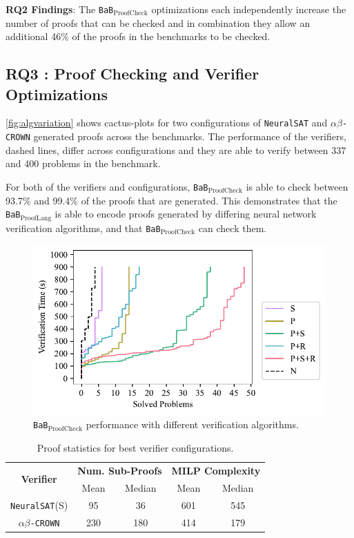\documentclass[oneside,11pt,dvipsnames]{book}
\newcommand{\ignore}[1]{}
\newcommand{\prooflang}{\texttt{BaB$_{\text{ProofLang}}$}}
\newcommand{\proofcheck}{\texttt{BaB$_{\text{ProofCheck}}$}}
\newcommand{\crown}{\texttt{$\alpha\beta$-CROWN}}
\newcommand{\neuralsat}{\texttt{NeuralSAT}}
\begin{document}
\begin{tcolorbox}[left=1pt,right=1pt,top=1pt,bottom=1pt]
\textbf{RQ2 Findings}: The \proofcheck{} optimizations each independently increase the number of proofs that can be checked and in combination they allow
an additional 46\% of the proofs in the benchmarks to be checked.
\end{tcolorbox}

\subsection{RQ3 : Proof Checking and Verifier Optimizations}
\label{sec:rq3}
\autoref{fig:algvariation} shows cactus-plots for two configurations of \neuralsat{} and \crown{} generated proofs across the benchmarks.   The performance of the verifiers, dashed lines, differ across configurations and they are able to 
verify between 337 and 400 problems in the benchmark.
\ignore{Number of Verified/Proved problems
    + abcrown(babsr):   337/335 = 99.4%
    + abcrown:          368/366 = 99.4%
    + neuralsat(SX):    387/363 = 93.7%
    + neuralsat(S)(SX): 400/384 = 96%
}
For both of the verifiers and configurations,
\proofcheck{} is able to check between 93.7\% and 99.4\% of the proofs that are generated.
This demonstrates that the \prooflang{} is able to encode proofs
generated by differing neural network verification algorithms, and
that \proofcheck{} can check them.

\begin{figure}[t]
    \centering
    \includegraphics[width=0.8\linewidth]{figure/ablation.pdf}
    \caption{\proofcheck{} performance with different verification algorithms.}
    \label{fig:algvariation}
\end{figure}

\begin{table}[t]
    \caption{Proof statistics for best verifier configurations.}
    \label{tab:sizestats}
    \centering
    \begin{tabular}{c|cc|cc}
        \toprule
         \multirow{2}{*}{\textbf{Verifier}} & \multicolumn{2}{c}{\textbf{Num. Sub-Proofs}} & \multicolumn{2}{|c}{\textbf{MILP Complexity}}\\
         & Mean & Median & Mean & Median \\ 
         \midrule
         \neuralsat{}(S) & 95 & 36 & 601 & 545 \\ 
         \midrule
         \crown{} & 230 & 180 & 414 & 179\\
         \bottomrule
    \end{tabular}
\end{table}
\end{document}
